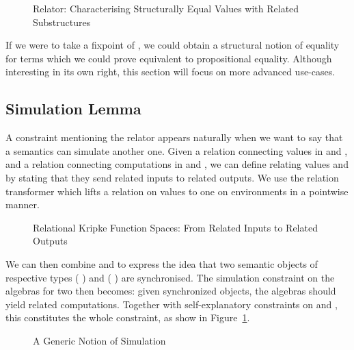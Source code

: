 \begin{figure}[h]
\caption{Relator: Characterising Structurally Equal Values with Related Substructures}
\end{figure}

If we were to take a fixpoint of , we could obtain a structural
notion of equality for terms which we could prove equivalent to propositional
equality. Although interesting in its own right, this section will focus
on more advanced use-cases.



\subsection{Simulation Lemma}\label{section:simulation}

A constraint mentioning the relator appears naturally when we want to say that a
semantics can simulate another one. Given a relation  connecting values
in  and , and a relation  connecting computations in
 and , we can define  relating values
   and   
by stating that they send related inputs to related outputs. We use
the relation transformer  which lifts a relation on values
to one on environments in a pointwise manner.

\begin{figure}[h]
\caption{Relational Kripke Function Spaces: From Related Inputs to Related Outputs}
\end{figure}

We can then combine  and  to express the idea
that two semantic objects of respective types
   (  ) and
   (  ) are
synchronised. The simulation constraint on the algebras for two \semrec{}
then becomes: given synchronized objects, the algebras should yield
related computations. Together with self-explanatory constraints on
 and , this constitutes the whole 
constraint, as show in Figure~\ref{fig:genericsim}.

\begin{figure}[h]
\caption{A Generic Notion of Simulation}\label{fig:genericsim}
\end{figure}


